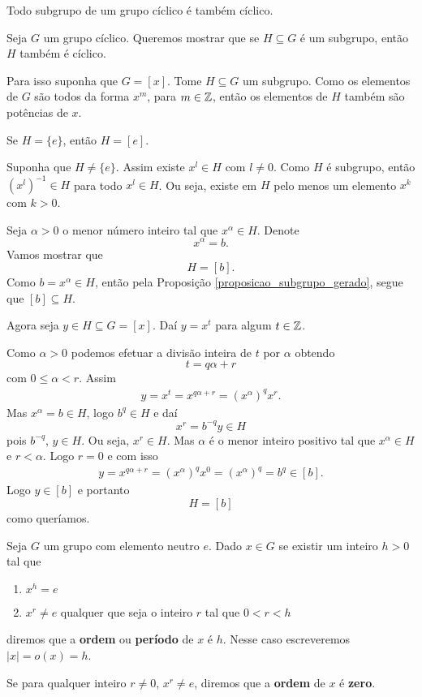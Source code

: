\begin{proposicao}
    Todo subgrupo de um grupo cíclico é também cíclico.
\end{proposicao}
\begin{prova}
    Seja $G$ um grupo cíclico. Queremos mostrar que se $H \subseteq G$ é um subgrupo, então $H$ também é cíclico.

    Para isso suponha que $G = [x]$. Tome $H \subseteq G$ um subgrupo. Como os elementos de $G$ são todos da forma $x^m$, para $m \in \mathbb{Z}$, então os elementos de $H$ também são potências de $x$.

    Se $H = \{e\}$, então $H = [e]$.

    Suponha que $H \ne \{e\}$. Assim existe $x^l \in H$ com $l \ne 0$. Como $H$ é subgrupo, então $(x^l)^{-1} \in H$ para todo $x^l \in H$. Ou seja, existe em $H$ pelo menos um elemento $x^k$ com $k > 0$.

    Seja $\alpha > 0$ o menor número inteiro tal que $x^\alpha \in H$. Denote
    \[
        x^\alpha = b.
    \]
    Vamos mostrar que
    \[
        H = [b].
    \]
    Como $b = x^\alpha \in H$, então pela Proposição \eqref{proposicao_subgrupo_gerado}, segue que $[b] \subseteq H$.

    Agora seja $y \in H \subseteq G = [x]$. Daí $y = x^t$ para algum $t \in \mathbb{Z}$.

    Como $\alpha > 0$ podemos efetuar a divisão inteira de $t$ por $\alpha$ obtendo
    \[
        t = q\alpha + r
    \]
    com $0 \le \alpha < r$. Assim
    \begin{align*}
        y = x^t = x^{q\alpha + r} = (x^{\alpha})^qx^r.
    \end{align*}
    Mas $x^\alpha = b \in H$, logo $b^q \in H$ e daí
    \[
        x^r = b^{-q}y\in H
    \]
    pois $b^{-q}$, $y \in H$. Ou seja, $x^r \in H$. Mas $\alpha$ é o menor inteiro positivo tal que $x^\alpha \in H$ e $r < \alpha$. Logo $r = 0$ e com isso
    \begin{align*}
        y = x^{q\alpha + r} = (x^{\alpha})^qx^0 = (x^{\alpha})^q = b^q \in [b].
    \end{align*}
    Logo $y \in [b]$ e portanto
    \[
        H = [b]
    \]
    como queríamos.
\end{prova}

\begin{definicao}
    Seja $G$ um grupo com elemento neutro $e$. Dado $x \in G$ se existir um inteiro $h > 0$ tal que
    \begin{enumerate}[label={\roman*})]
        \item $x^h = e$
        \item $x^r \ne e$ qualquer que seja o inteiro $r$ tal que $0 < r < h$
    \end{enumerate}
    diremos que a \textbf{ordem} ou \textbf{período} de $x$ é $h$. Nesse caso escreveremos $|x| = o(x) = h$.

    Se para qualquer inteiro $r \ne 0$, $x^r \ne e$, diremos que a \textbf{ordem} de $x$ é \textbf{zero}.
\end{definicao}

